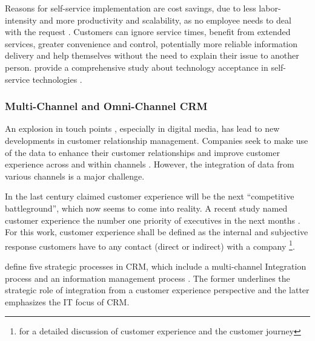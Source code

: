 		Reasons for self-service implementation are cost savings, due to less labor-intensity and more productivity and scalability, as no employee needs to deal with the request \citep{Walker_2002, Walker_2003}. Customers can ignore service times, benefit from extended services, greater convenience and control, potentially more reliable information delivery and help themselves without the need to explain their issue to another person. \citeauthor{Blut_2016} provide a comprehensive study about technology acceptance in self-service technologies \citep{Blut_2016}. 
		
	\subsubsection{Multi-Channel and Omni-Channel CRM}
		An explosion in touch points \citep{Lemon_2016}, especially in digital media, has lead to new developments in customer relationship management. Companies seek to make use of the data to enhance their customer relationships and improve customer experience across and within channels \citep{Frow_2007}. However, the integration of data from various channels is a major challenge. 
		
		In the last century \citeauthor{gilmore1998} claimed customer experience will be the next \enquote{competitive battleground}, which now seems to come into reality. A recent study named customer experience the number one priority of executives in the next months \citep{accenture2015}. For this work, customer experience shall be defined as the internal and subjective response customers have to any contact (direct or indirect) with a company \citep{meyer2007customer}\footnote{\cf \cite{Lemon_2016} for a detailed discussion of customer experience and the customer journey }.
		
		\citeauthor{payne2004role} define five strategic processes in \acrshort{CRM}, which include a multi-channel Integration process and an information management process \citep{payne2004role}. The former underlines the strategic role of integration from a customer experience perspective and the latter emphasizes the IT focus of CRM. 
		
